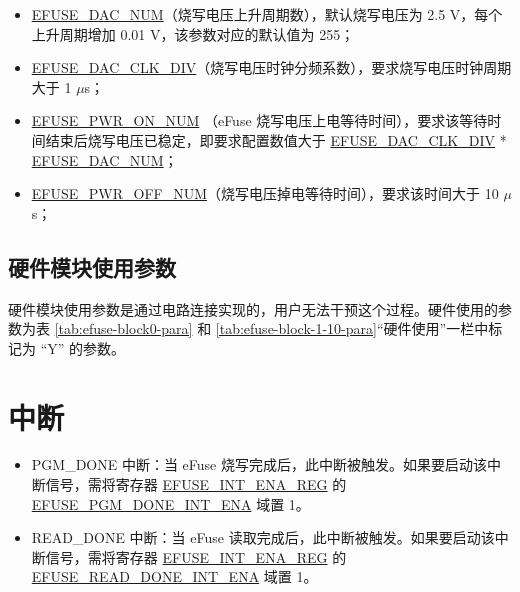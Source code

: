 \documentclass[main\_\_CN.tex]{subfiles}
\begin{document}
\begin{itemize}
    \item \hyperref[fielddesc:EFUSEDACNUM]{EFUSE\_DAC\_NUM}（烧写电压上升周期数），默认烧写电压为 2.5 V，每个上升周期增加 0.01 V，该参数对应的默认值为 255；
    \item \hyperref[fielddesc:EFUSEDACCLKDIV]{EFUSE\_DAC\_CLK\_DIV}（烧写电压时钟分频系数），要求烧写电压时钟周期大于 1 $\mu$s；
    \item \hyperref[fielddesc:EFUSEPWRONNUM]{EFUSE\_PWR\_ON\_NUM} （eFuse 烧写电压上电等待时间），要求该等待时间结束后烧写电压已稳定，即要求配置数值大于 \hyperref[fielddesc:EFUSEDACCLKDIV]{EFUSE\_DAC\_CLK\_DIV} * \hyperref[fielddesc:EFUSEDACNUM]{EFUSE\_DAC\_NUM}；
    \item \hyperref[fielddesc:EFUSEPWROFFNUM]{EFUSE\_PWR\_OFF\_NUM}（烧写电压掉电等待时间），要求该时间大于 10 $\mu$s；
\end{itemize}



\subsection{硬件模块使用参数}

硬件模块使用参数是通过电路连接实现的，用户无法干预这个过程。硬件使用的参数为表 \ref{tab:efuse-block0-para} 和 \ref{tab:efuse-block-1-10-para}“硬件使用”一栏中标记为 “Y” 的参数。


\section{中断}

\begin{itemize}
\item PGM\_DONE 中断：当 eFuse 烧写完成后，此中断被触发。如果要启动该中断信号，需将寄存器 \hyperref[regdesc:EFUSEINTENAREG]{EFUSE\_INT\_ENA\_REG} 的 \hyperref[fielddesc:EFUSEPGMDONEINTENA]{EFUSE\_PGM\_DONE\_INT\_ENA} 域置 1。
\item READ\_DONE 中断：当 eFuse 读取完成后，此中断被触发。如果要启动该中断信号，需将寄存器 \hyperref[regdesc:EFUSEINTENAREG]{EFUSE\_INT\_ENA\_REG} 的 \hyperref[fielddesc:EFUSEREADDONEINTENA]{EFUSE\_READ\_DONE\_INT\_ENA} 域置 1。
\end{itemize}


\end{document}
